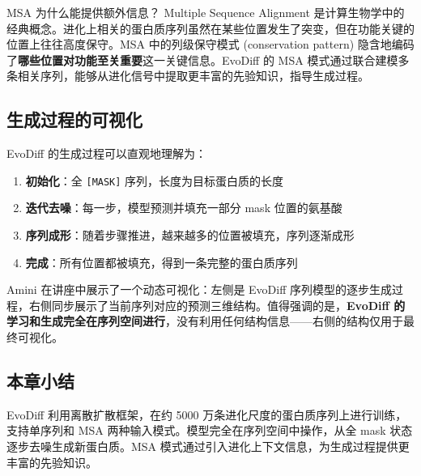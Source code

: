 \begin{knowledgebox}{MSA 为什么能提供额外信息？}
Multiple Sequence Alignment 是计算生物学中的经典概念。进化上相关的蛋白质序列虽然在某些位置发生了突变，但在功能关键的位置上往往高度保守。MSA 中的列级保守模式 (conservation pattern) 隐含地编码了\textbf{哪些位置对功能至关重要}这一关键信息。EvoDiff 的 MSA 模式通过联合建模多条相关序列，能够从进化信号中提取更丰富的先验知识，指导生成过程。
\end{knowledgebox}

\subsection{生成过程的可视化}

EvoDiff 的生成过程可以直观地理解为：

\begin{enumerate}
    \item \textbf{初始化}：全 \texttt{[MASK]} 序列，长度为目标蛋白质的长度
    \item \textbf{迭代去噪}：每一步，模型预测并填充一部分 mask 位置的氨基酸
    \item \textbf{序列成形}：随着步骤推进，越来越多的位置被填充，序列逐渐成形
    \item \textbf{完成}：所有位置都被填充，得到一条完整的蛋白质序列
\end{enumerate}

Amini 在讲座中展示了一个动态可视化：左侧是 EvoDiff 序列模型的逐步生成过程，右侧同步展示了当前序列对应的预测三维结构。值得强调的是，\textbf{EvoDiff 的学习和生成完全在序列空间进行}，没有利用任何结构信息——右侧的结构仅用于最终可视化。

\subsection{本章小结}

EvoDiff 利用离散扩散框架，在约 5000 万条进化尺度的蛋白质序列上进行训练，支持单序列和 MSA 两种输入模式。模型完全在序列空间中操作，从全 mask 状态逐步去噪生成新蛋白质。MSA 模式通过引入进化上下文信息，为生成过程提供更丰富的先验知识。


